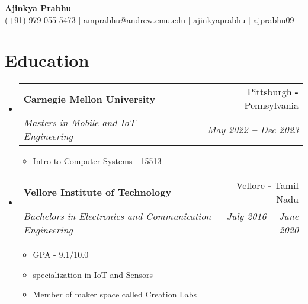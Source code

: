 \documentclass[12pt]{article}
\makeatletter
\newcommand{\resumeItem}[1]{
  \item\small{
    {#1}
  } \vspace{-2pt}
}
\newcommand{\resumeSubheading}[4]{
  \item
    \begin{tabular*}{0.97\textwidth}[t]{l@{\extracolsep{\fill}}r}
      \textbf{\small#1} & \small#2 \\
      \textit{\small#3} & \textit{\small #4} \\
    \end{tabular*}
}
\newcommand{\resumeSubHeadingListStart}{\begin{itemize}[leftmargin=0.15in, label={}]}
\newcommand{\resumeSubHeadingListEnd}{\end{itemize}}
\newcommand{\resumeItemListStart}{\begin{itemize}\vspace{-8pt}}
\newcommand{\resumeItemListEnd}{\end{itemize}\vspace{-8pt}}
\makeatother
\begin{document}

\begin{flushleft}
    \textbf{\Large Ajinkya Prabhu} \\ \vspace{2 pt}
    \small
    \faMobile \hspace{.5pt} \href{tel:919790555473}{(+91) 979-055-5473}
    $|$
    \small
    \faAt \hspace{.5pt} \href{mailto:amprabhu@andrew.cmu.edu}{amprabhu@andrew.cmu.edu}
    $|$
    \small
    \faLinkedinSquare \hspace{.5pt} \href{https://www.linkedin.com/in/ajinkyaprabhu/}{ajinkyaprabhu}
    $|$
    \small
    \faGithub \hspace{.5pt} \href{https://github.com/ajprabhu09}{ajprabhu09}
\end{flushleft}




    
   
\section{Education}
    \resumeSubHeadingListStart
    \resumeSubheading
      {Carnegie Mellon University}{Pittsburgh \textbf{-} Pennsylvania}
      {Masters in Mobile and IoT Engineering}{May 2022 \textbf{--} Dec 2023}
        \resumeItemListStart
            \resumeItem{Intro to Computer Systems - 15513}
        \resumeItemListEnd
    
    \resumeSubheading
      {Vellore Institute of Technology}{Vellore \textbf{-} Tamil Nadu}
      {Bachelors in Electronics and Communication Engineering}{July 2016 \textbf{--} June 2020}
        \resumeItemListStart
            \resumeItem{GPA - 9.1/10.0}
            \resumeItem{specialization in IoT and Sensors}
            \resumeItem{Member of maker space called Creation Labs}
        \resumeItemListEnd
    \resumeSubHeadingListEnd
    \vspace{0pt}
\end{document}
